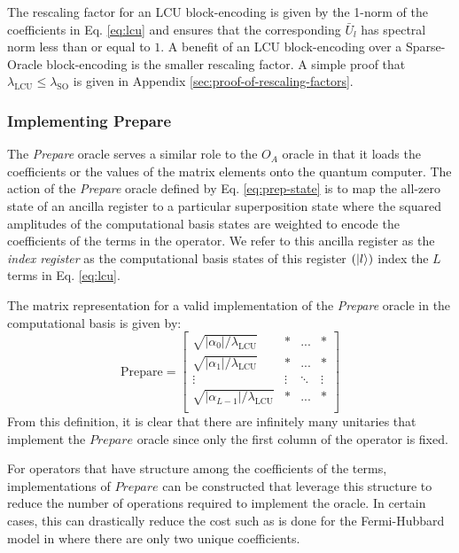 The rescaling factor for an LCU block-encoding is given by the 1-norm of the coefficients in Eq. \ref{eq:lcu} and ensures that the corresponding $\bar{U}_l$ has spectral norm less than or equal to $1$.
A benefit of an LCU block-encoding over a Sparse-Oracle block-encoding is the smaller rescaling factor.
A simple proof that $\lambda_\text{LCU} \leq \lambda_\text{SO}$ is given in Appendix \ref{sec:proof-of-rescaling-factors}.

\subsubsection{Implementing \textbf{Prepare}}

The \textit{Prepare} oracle serves a similar role to the $O_A$ oracle in that it loads the coefficients or the values of the matrix elements onto the quantum computer.
The action of the \textit{Prepare} oracle defined by Eq. \ref{eq:prep-state} is to map the all-zero state of an ancilla register to a particular superposition state where the squared amplitudes of the computational basis states are weighted to encode the coefficients of the terms in the operator.
We refer to this ancilla register as the \textit{index register} as the computational basis states of this register $(\ket{l})$ index the $L$ terms in Eq. \ref{eq:lcu}.

The matrix representation for a valid implementation of the \textit{Prepare} oracle in the computational basis is given by:
\begin{equation}
    \text{Prepare} = \begin{bmatrix}
        \sqrt{|\alpha_0| / \lambda_\text{LCU}} & * & ... & * \\
        \sqrt{|\alpha_1| / \lambda_\text{LCU}} & * & ... & * \\
        \vdots & \vdots & \ddots & \vdots \\
        \sqrt{|\alpha_{L-1} |/ \lambda_\text{LCU}} & * & ... & * \\
    \end{bmatrix}
\end{equation}
From this definition, it is clear that there are infinitely many unitaries that implement the $\textit{Prepare}$ oracle since only the first column of the operator is fixed.

For operators that have structure among the coefficients of the terms, implementations of $\textit{Prepare}$ can be constructed that leverage this structure to reduce the number of operations required to implement the oracle.
In certain cases, this can drastically reduce the cost such as is done for the Fermi-Hubbard model in \cite{babbush2018encoding} where there are only two unique coefficients.

